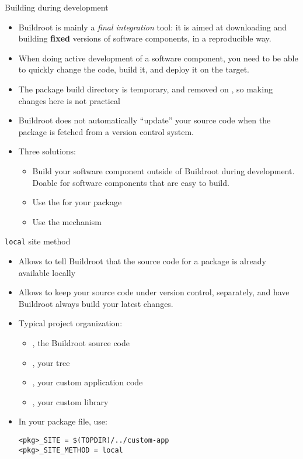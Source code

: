 \begin{frame}{Building during development}
  \begin{itemize}
  \item Buildroot is mainly a {\em final integration} tool: it is
    aimed at downloading and building {\bf fixed} versions of software
    components, in a reproducible way.
  \item When doing active development of a software component, you
    need to be able to quickly change the code, build it, and deploy
    it on the target.
  \item The package build directory is temporary, and removed on
    , so making changes here is not practical
  \item Buildroot does not automatically ``update'' your source code
    when the package is fetched from a version control system.
  \item Three solutions:
    \begin{itemize}
    \item Build your software component outside of Buildroot during
      development. Doable for software components that are easy to
      build.
    \item Use the   for your package
    \item Use the  mechanism
    \end{itemize}
  \end{itemize}
\end{frame}

\begin{frame}[fragile]{{\tt local} site method}
  \begin{itemize}
  \item Allows to tell Buildroot that the source code for a package is
    already available locally
  \item Allows to keep your source code under version control,
    separately, and have Buildroot always build your latest changes.
  \item Typical project organization:
    \begin{itemize}
    \item {}, the Buildroot source code
    \item {}, your  tree
    \item {}, your custom application code
    \item {}, your custom library
    \end{itemize}
  \item In your package  file, use:
    \begin{block}{}
\begin{verbatim}
<pkg>_SITE = $(TOPDIR)/../custom-app
<pkg>_SITE_METHOD = local
\end{verbatim}
    \end{block}
  \end{itemize}
\end{frame}

